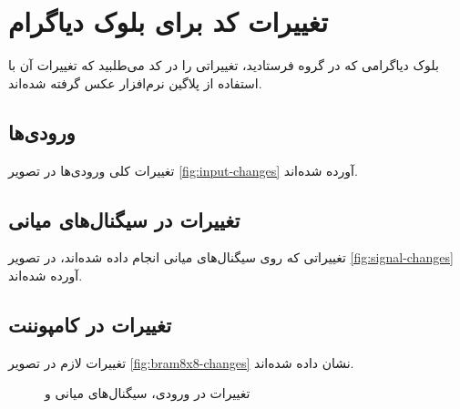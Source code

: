 \documentclass[dvipsnames, svgnames, x11names, a4paper, 11pt]{article}
\begin{document}
\section{تغییرات کد برای بلوک دیاگرام}
بلوک دیاگرامی که در گروه فرستادید، تغییراتی را در کد 
می‌طلبید که تغییرات آن با استفاده از پلاگین  نرم‌افزار 
عکس گرفته شده‌اند.

\subsection{ورودی‌ها}
تغییرات کلی ورودی‌‌‌ها در تصویر 
\ref{fig:input-changes}
آورده شده‌اند.

\subsection{تغییرات در سیگنال‌های میانی}
تغییراتی که روی سیگنا‌ل‌های میانی انجام داده شده‌اند، در تصویر
\ref{fig:signal-changes}
آورده شده‌اند.

\subsection{تغییرات در کامپوننت }
تغییرات لازم در تصویر 
\ref{fig:bram8x8-changes}
نشان داده شده‌اند.

\begin{figure}[b]
\begin{center}
\hspace{5mm}
\hspace{5mm}
\end{center}
\caption{تغییرات در ورودی، سیگنال‌های میانی و }
\label{fig:changes}
\end{figure}
\listoffigures
\end{document}
